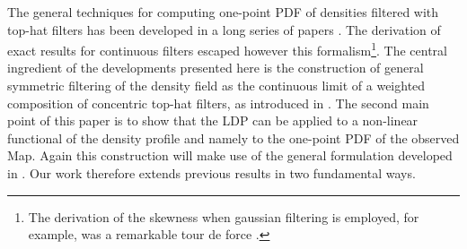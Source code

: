 \documentclass[twocolumn,aps,reprint, nofootinbib]{revtex4}
\begin{document}
The general techniques for computing one-point PDF of densities filtered 
with top-hat filters has been developed in a long series of papers \cite{1994A&A...291..697B, 1994ApJ...433....1B, Bernardeau:1994hn, bernardeau2014statistics}. The derivation of exact results for continuous filters escaped however this formalism\footnote{The derivation of the skewness when gaussian filtering is employed, for example, was a remarkable tour de force \cite{1993ApJ...412L...9J}.}. The central ingredient of the developments presented here is the construction of general symmetric filtering of the density field as the continuous limit of a weighted composition of concentric top-hat filters, as introduced in \cite{Bernardeau:2015khs}. The second main point of this paper is to show that the LDP can be applied to  a non-linear functional of the density profile and namely to the one-point PDF of the observed Map. Again this construction will make use of the general formulation developed in \cite{Bernardeau:2015khs}. Our work therefore extends previous results in two fundamental ways.
%
%
%
\end{document}
